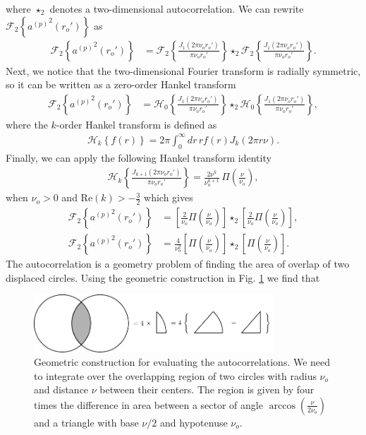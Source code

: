 \documentclass[11pt]{article}
\begin{document}
where $\star_2$ denotes a two-dimensional autocorrelation. We can rewrite
$\mathcal{F}_2\left\{{a^{(p)}}^2(r_o')\right\}$ as
\begin{align}
  \mathcal{F}_2\left\{{a^{(p)}}^2(r_o')\right\} &= \mathcal{F}_2\left\{\frac{J_1(2\pi\nu_o r_o')}{\pi\nu_o r_o'}\right\} \star_2 \mathcal{F}_2\left\{\frac{J_1(2\pi\nu_o r_o')}{\pi\nu_o r_o'}\right\}.
\end{align}
Next, we notice that the two-dimensional Fourier transform is radially
symmetric, so it can be written as a zero-order Hankel transform
\begin{align}
\mathcal{F}_2\left\{{a^{(p)}}^2(r_o')\right\} &= \mathcal{H}_0\left\{\frac{J_1(2\pi\nu_o r_o')}{\pi\nu_o r_o'}\right\} \star_2 \mathcal{H}_0\left\{\frac{J_1(2\pi\nu_o r_o')}{\pi\nu_o r_o'}\right\}, 
\end{align}
where the $k$-order Hankel transform is defined as
\begin{align}
  \mathcal{H}_k\left\{f(r)\right\} = 2\pi \int_0^\infty dr\, r f(r)J_k(2\pi r\nu).
\end{align}
Finally, we can apply the following Hankel transform identity
\begin{align}
  \mathcal{H}_{k}\left\{\frac{J_{k+1}(2\pi \nu_or_o')}{\pi\nu_o r_o'}\right\} =
  \frac{2\nu^k}{\nu_o^{k+1}}\, \Pi\left(\frac{\nu}{\nu_o}\right)\label{eq:hankstar2},
\end{align}
when $\nu_o > 0$ and $\text{Re}(k) > -\frac{3}{2}$ \cite{poul1998} which gives
\begin{align}
  \mathcal{F}_2\left\{{a^{(p)}}^2(r_o')\right\} &= \left[\frac{2}{\nu_o}\Pi\left(\frac{\nu}{\nu_o}\right)\right] \star_2 \left[\frac{2}{\nu_o}\Pi\left(\frac{\nu}{\nu_o}\right)\right],\\
  \mathcal{F}_2\left\{{a^{(p)}}^2(r_o')\right\} &= \frac{4}{\nu_o^2}\left[\Pi\left(\frac{\nu}{\nu_o}\right)\right] \star_2 \left[\Pi\left(\frac{\nu}{\nu_o}\right)\right].
\end{align}
The autocorrelation is a geometry problem of finding the area of overlap of two
displaced circles. Using the geometric construction in Fig. \ref{fig:geometry} we find that
\begin{figure}[h]
 \captionsetup{width=1.0\linewidth}
 \centering
   \centering
   \includegraphics[width = 0.8\textwidth]{../figures/geometry/geometry.pdf}
   \caption{Geometric construction for evaluating the autocorrelations. We need
     to integrate over the overlapping region of two circles with radius $\nu_o$
     and distance $\nu$ between their centers. The region is given by four times
     the difference in area between a sector of angle
     $\arccos\left(\frac{\nu}{2\nu_o}\right)$ and a triangle with base $\nu/2$
     and hypotenuse $\nu_o$.}
   \label{fig:geometry}
\end{figure}
\end{document}
